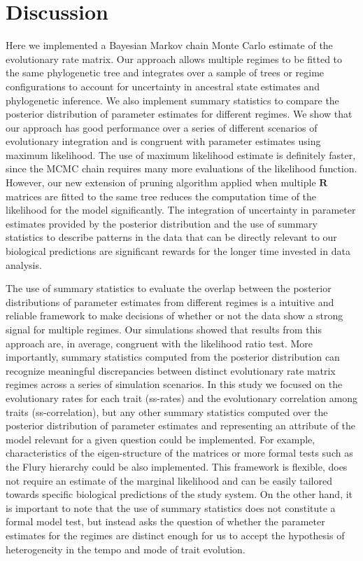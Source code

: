 \section{Discussion}

Here we implemented a Bayesian Markov chain Monte Carlo estimate of the evolutionary rate matrix. Our approach allows multiple regimes to be fitted to the same phylogenetic tree and integrates over a sample of trees or regime configurations to account for uncertainty in ancestral state estimates and phylogenetic inference. We also implement summary statistics to compare the posterior distribution of parameter estimates for different regimes. We show that our approach has good performance over a series of different scenarios of evolutionary integration and is congruent with parameter estimates using maximum likelihood. The use of maximum likelihood estimate is definitely faster, since the MCMC chain requires many more evaluations of the likelihood function. However, our new extension of \citet{felsenstein_1973} pruning algorithm applied when multiple $\mathbf{R}$ matrices are fitted to the same tree reduces the computation time of the likelihood for the model significantly. The integration of uncertainty in parameter estimates provided by the posterior distribution and the use of summary statistics to describe patterns in the data that can be directly relevant to our biological predictions are significant rewards for the longer time invested in data analysis.

The use of summary statistics to evaluate the overlap between the posterior distributions of parameter estimates from different regimes is a intuitive and reliable framework to make decisions of whether or not the data show a strong signal for multiple regimes. Our simulations showed that results from this approach are, in average, congruent with the likelihood ratio test. More importantly, summary statistics computed from the posterior distribution can recognize meaningful discrepancies between distinct evolutionary rate matrix regimes across a series of simulation scenarios. In this study we focused on the evolutionary rates for each trait (ss-rates) and the evolutionary correlation among traits (ss-correlation), but any other summary statistics computed over the posterior distribution of parameter estimates and representing an attribute of the model relevant for a given question could be implemented. For example, characteristics of the eigen-structure of the matrices or more formal tests such as the Flury hierarchy \citep{phillips_hierarchical_1999} could be also implemented. This framework is flexible, does not require an estimate of the marginal likelihood and can be easily tailored towards specific biological predictions of the study system. On the other hand, it is important to note that the use of summary statistics does not constitute a formal model test, but instead asks the question of whether the parameter estimates for the regimes are distinct enough for us to accept the hypothesis of heterogeneity in the tempo and mode of trait evolution.

